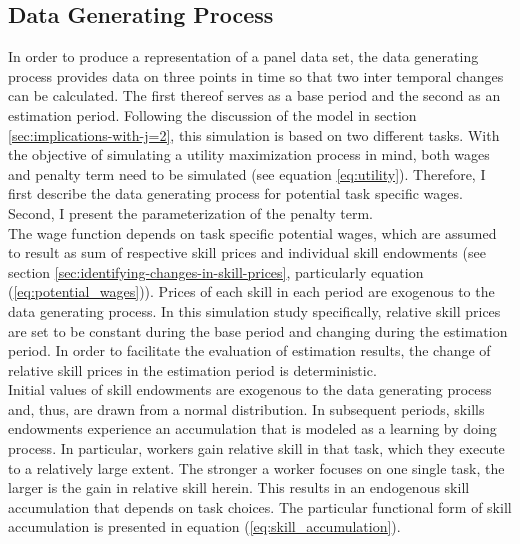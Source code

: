 \documentclass[../main.tex]{subfiles}
\begin{document}
\subsection{Data Generating Process} \label{sec:DGP}
In order to produce a representation of a panel data set, the data generating process provides data on three points in time so that two inter temporal changes can be calculated. The first thereof serves as a base period and the second as an estimation period. Following the discussion of the model in section \ref{sec:implications-with-j=2}, this simulation is based on two different tasks. With the objective of simulating a utility maximization process in mind, both wages and penalty term need to be simulated (see equation \ref{eq:utility}). Therefore, I first describe the data generating process for potential task specific wages. Second, I present the parameterization of the penalty term.
\\
The wage function depends on task specific potential wages, which are assumed to result as sum of respective skill prices and individual skill endowments (see section \ref{sec:identifying-changes-in-skill-prices}, particularly equation (\ref{eq:potential_wages})). Prices of each skill in each period are exogenous to the data generating process. In this simulation study specifically, relative skill prices are set to be constant during the base period and changing during the estimation period. In order to facilitate the evaluation of estimation results, the change of relative skill prices in the estimation period is deterministic.
\\
Initial values of skill endowments are exogenous to the data generating process and, thus, are drawn from a normal distribution. In subsequent periods, skills endowments experience an accumulation that is modeled as a learning by doing process. In particular, workers gain relative skill in that task, which they execute to a relatively large extent. The stronger a worker focuses on one single task, the larger is the gain in relative skill herein. This results in an endogenous skill accumulation that depends on task choices. The particular functional form of skill accumulation is presented in equation (\ref{eq:skill_accumulation}).
\end{document}
